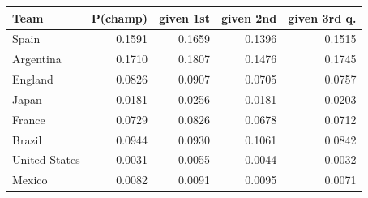 \begin{tabular}{lrrrr}
\toprule
Team & P(champ) & given 1st & given 2nd & given 3rd q. \\
\midrule
Spain & 0.1591 & 0.1659 & 0.1396 & 0.1515 \\
Argentina & 0.1710 & 0.1807 & 0.1476 & 0.1745 \\
England & 0.0826 & 0.0907 & 0.0705 & 0.0757 \\
Japan & 0.0181 & 0.0256 & 0.0181 & 0.0203 \\
France & 0.0729 & 0.0826 & 0.0678 & 0.0712 \\
Brazil & 0.0944 & 0.0930 & 0.1061 & 0.0842 \\
United States & 0.0031 & 0.0055 & 0.0044 & 0.0032 \\
Mexico & 0.0082 & 0.0091 & 0.0095 & 0.0071 \\
\bottomrule
\end{tabular}

